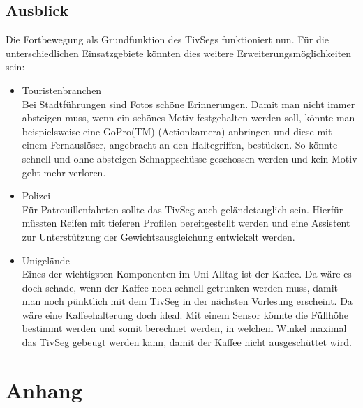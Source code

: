 \documentclass[a4paper,10pt,twoside]{report}
\begin{document}
\section{Ausblick}
Die Fortbewegung als Grundfunktion des TivSegs funktioniert nun. Für die unterschiedlichen Einsatzgebiete könnten dies weitere Erweiterungsmöglichkeiten sein:

\begin{itemize}
\item Touristenbranchen\\
Bei Stadtführungen sind Fotos schöne Erinnerungen. Damit man nicht immer absteigen muss, wenn ein schönes Motiv festgehalten werden soll, könnte man beispielsweise eine GoPro(TM) (Actionkamera) anbringen und diese mit einem Fernauslöser, angebracht an den Haltegriffen, bestücken. So könnte schnell und ohne absteigen Schnappschüsse geschossen werden und kein Motiv geht mehr verloren.
\item Polizei \\
Für Patrouillenfahrten sollte das TivSeg auch geländetauglich sein. Hierfür müssten Reifen mit tieferen Profilen bereitgestellt werden und eine Assistent zur Unterstützung der Gewichtsausgleichung entwickelt werden.
\item Unigelände\\
Eines der wichtigsten Komponenten im Uni-Alltag ist der Kaffee. Da wäre es doch schade, wenn der Kaffee noch schnell getrunken werden muss, damit man noch pünktlich mit dem TivSeg in der nächsten Vorlesung erscheint. Da wäre eine Kaffeehalterung doch ideal. Mit einem Sensor könnte die Füllhöhe bestimmt werden und somit berechnet werden, in welchem Winkel maximal das TivSeg gebeugt werden kann, damit der Kaffee nicht ausgeschüttet wird. 
\end{itemize}  
\chapter{Anhang}
\nocite{*}


\end{document}
